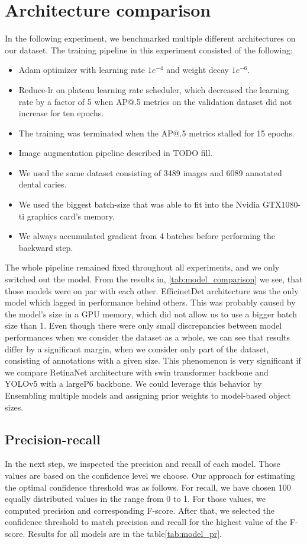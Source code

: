 \section{Architecture comparison}
In the following experiment, we benchmarked multiple different architectures on our dataset. The training pipeline in this experiment consisted of the following:
\begin{itemize}
    \item  Adam optimizer with learning rate $1e^{-4}$ and weight decay $1e^{-6}$.
    \item Reduce-lr on plateau learning rate scheduler, which decreased the learning rate by a factor of 5 when AP@.5 metrics on the validation dataset did not increase for ten epochs.
    \item The training was terminated when the AP@.5 metrics stalled for 15 epochs.
    \item Image augmentation pipeline described in TODO fill. 
    \item We used the same dataset consisting of 3489 images and 6089 annotated dental caries.
    \item We used the biggest batch-size that was able to fit into the Nvidia GTX1080-ti graphics card's memory.
    \item We always accumulated gradient from 4 batches before performing the backward step.
\end{itemize}
The whole pipeline remained fixed throughout all experiments, and we only switched out the model. From the results in, \ref{tab:model_comparison} we see, that those models were on par with each other. EfficinetDet architecture was the only model which lagged in performance behind others. This was probably caused by the model's size in a GPU memory, which did not allow us to use a bigger batch size than 1. Even though there were only small discrepancies between model performances when we consider the dataset as a whole, we can see that results differ by a significant margin, when we consider only part of the dataset, consisting of annotations with a given size. This phenomenon is very significant if we compare RetinaNet architecture with swin transformer backbone and YOLOv5 with a largeP6 backbone. We could leverage this behavior by Ensembling multiple models and assigning prior weights to model-based object sizes.
\subsection{Precision-recall}
In the next step, we inspected the precision and recall of each model. Those values are based on the confidence level we choose. Our approach for estimating the optimal confidence threshold was as follows. For recall, we have chosen 100 equally distributed values in the range from 0 to 1. For those values, we computed precision and corresponding F-score. After that, we selected the confidence threshold to match precision and recall for the highest value of the F-score. Results for all models are in the table\ref{tab:model_pr}.

